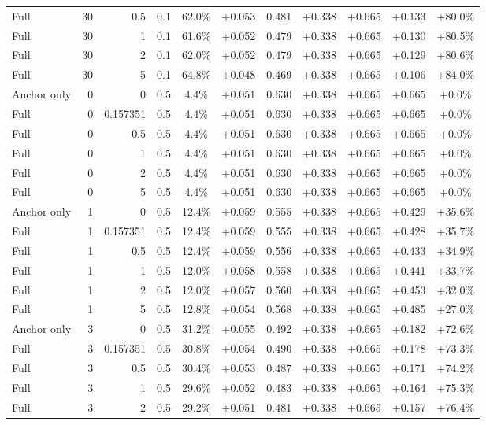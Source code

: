 \begin{table}[htbp]
\begin{tabular}{lrrrccccccc}
Full & 30 & 0.5 & 0.1 & 62.0\% & +0.053 & 0.481 & +0.338 & +0.665 & +0.133 & +80.0\% \\
Full & 30 & 1 & 0.1 & 61.6\% & +0.052 & 0.479 & +0.338 & +0.665 & +0.130 & +80.5\% \\
Full & 30 & 2 & 0.1 & 62.0\% & +0.052 & 0.479 & +0.338 & +0.665 & +0.129 & +80.6\% \\
Full & 30 & 5 & 0.1 & 64.8\% & +0.048 & 0.469 & +0.338 & +0.665 & +0.106 & +84.0\% \\
Anchor only & 0 & 0 & 0.5 & 4.4\% & +0.051 & 0.630 & +0.338 & +0.665 & +0.665 & +0.0\% \\
Full & 0 & 0.157351 & 0.5 & 4.4\% & +0.051 & 0.630 & +0.338 & +0.665 & +0.665 & +0.0\% \\
Full & 0 & 0.5 & 0.5 & 4.4\% & +0.051 & 0.630 & +0.338 & +0.665 & +0.665 & +0.0\% \\
Full & 0 & 1 & 0.5 & 4.4\% & +0.051 & 0.630 & +0.338 & +0.665 & +0.665 & +0.0\% \\
Full & 0 & 2 & 0.5 & 4.4\% & +0.051 & 0.630 & +0.338 & +0.665 & +0.665 & +0.0\% \\
Full & 0 & 5 & 0.5 & 4.4\% & +0.051 & 0.630 & +0.338 & +0.665 & +0.665 & +0.0\% \\
Anchor only & 1 & 0 & 0.5 & 12.4\% & +0.059 & 0.555 & +0.338 & +0.665 & +0.429 & +35.6\% \\
Full & 1 & 0.157351 & 0.5 & 12.4\% & +0.059 & 0.555 & +0.338 & +0.665 & +0.428 & +35.7\% \\
Full & 1 & 0.5 & 0.5 & 12.4\% & +0.059 & 0.556 & +0.338 & +0.665 & +0.433 & +34.9\% \\
Full & 1 & 1 & 0.5 & 12.0\% & +0.058 & 0.558 & +0.338 & +0.665 & +0.441 & +33.7\% \\
Full & 1 & 2 & 0.5 & 12.0\% & +0.057 & 0.560 & +0.338 & +0.665 & +0.453 & +32.0\% \\
Full & 1 & 5 & 0.5 & 12.8\% & +0.054 & 0.568 & +0.338 & +0.665 & +0.485 & +27.0\% \\
Anchor only & 3 & 0 & 0.5 & 31.2\% & +0.055 & 0.492 & +0.338 & +0.665 & +0.182 & +72.6\% \\
Full & 3 & 0.157351 & 0.5 & 30.8\% & +0.054 & 0.490 & +0.338 & +0.665 & +0.178 & +73.3\% \\
Full & 3 & 0.5 & 0.5 & 30.4\% & +0.053 & 0.487 & +0.338 & +0.665 & +0.171 & +74.2\% \\
Full & 3 & 1 & 0.5 & 29.6\% & +0.052 & 0.483 & +0.338 & +0.665 & +0.164 & +75.3\% \\
Full & 3 & 2 & 0.5 & 29.2\% & +0.051 & 0.481 & +0.338 & +0.665 & +0.157 & +76.4\% \\

\end{tabular}
\end{table}
